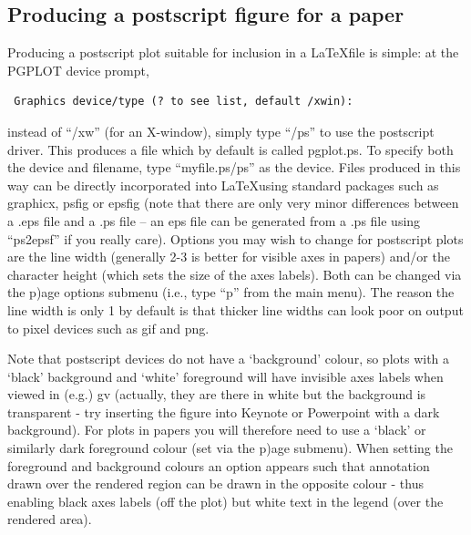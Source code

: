 \documentclass[a4paper,10pt]{article}
\begin{document}
\subsection{Producing a postscript figure for a paper}
\label{sec:postscript}
 Producing a postscript plot suitable for inclusion in a \LaTeX  file is simple: at the PGPLOT device prompt, 
\begin{verbatim}
 Graphics device/type (? to see list, default /xwin):
\end{verbatim}
instead of ``/xw'' (for an X-window), simply type ``/ps'' to use the postscript driver. This produces a file which by default is called pgplot.ps. To specify both the device and filename, type ``myfile.ps/ps'' as the device. Files produced in this way can be directly incorporated into \LaTeX  using standard packages such as graphicx, psfig or epsfig (note that there are only very minor differences between a .eps file and a .ps file -- an eps file can be generated from a .ps file using ``ps2epsf'' if you really care). Options you may wish to change for postscript plots are the line width (generally 2-3 is better for visible axes in papers) and/or the character height (which sets the size of the axes labels). Both can be changed via the p)age options submenu (i.e., type ``p'' from the main menu). The reason the line width is only 1 by default is that thicker line widths can look poor on output to pixel devices such as gif and png.

 Note that postscript devices do not have a `background' colour, so plots with a `black' background and `white' foreground will have invisible axes labels when viewed in (e.g.) gv (actually, they are there in white but the background is transparent - try inserting the figure into Keynote or Powerpoint with a dark background). For plots in papers you will therefore need to use a `black' or similarly dark foreground colour (set via the p)age submenu). When setting the foreground and background colours an option appears such that annotation drawn over the rendered region can be drawn in the opposite colour - thus enabling black axes labels (off the plot) but white text in the legend (over the rendered area).
\end{document}
